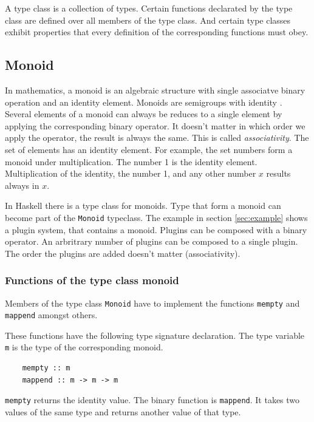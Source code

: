 A type class is a collection of types. Certain functions declarated by the type class are defined over all members of the type class. And certain type classes exhibit properties that every definition of the corresponding functions must obey.

\subsection{Monoid}
\label{sec:monoid}

In mathematics, a \gls{monoid} is an algebraic structure with single associatve binary operation and an identity element. Monoids are semigroups with identity \cite{wiki:monoid}. Several elements of a monoid can always be reduces to a single element by applying the corresponding binary operator. It doesn't matter in which order we apply the operator, the result is always the same. This is called \emph{\gls{associativity}}. The set of elements has an identity element. For example, the set numbers form a monoid under multiplication. The number 1 is the identity element. Multiplication of the identity, the number 1, and any other number $x$ results always in $x$.

In Haskell there is a type class for monoids. Type that form a monoid can become part of the \verb|Monoid| typeclass. The example in section \ref{sec:example} shows a plugin system, that contains a monoid. Plugins can be composed with a binary operator. An arbritrary number of plugins can be composed to a single plugin. The order the plugins are added doesn't matter (\gls{associativity}). 

\subsubsection{Functions of the type class monoid}

Members of the type class \verb|Monoid| have to implement the functions \verb|mempty| and \verb|mappend| amongst others.

These functions have the following type signature declaration. The type variable \verb|m| is the type of the corresponding monoid.
\begin{verbatim}
    mempty :: m
    mappend :: m -> m -> m
\end{verbatim}

\verb|mempty| returns the identity value. The binary function is \verb|mappend|. It takes two values of the same type and returns another value of that type. 

